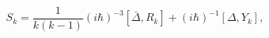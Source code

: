 \begin{equation}\label{4.27}
S_k=\frac{1}{k(k-1)}(i\hbar)^{-3}[\bar{\Delta},R_k]+(i\hbar)^{-1}[\Delta,Y_k],
\end{equation}

